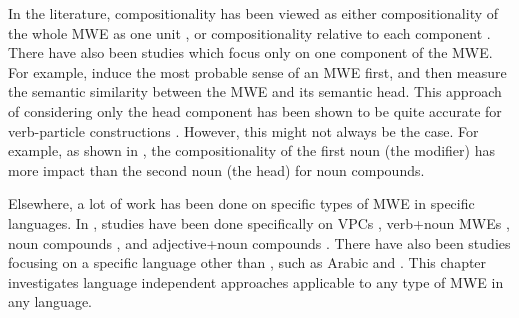 \documentclass[output=paper
,modfonts
,nonflat]{langsci/langscibook}
\begin{document}
In the literature, compositionality has been viewed as either
compositionality of the whole MWE as one unit
\citep{mccarthy2003,venkatapathy2005,Katz06automaticidentification,Biemann2011,farahmand2015},
or compositionality relative to each component
\citep{reddy2011a,hermann2012,SchulteImWalde+:2013}.  There have also
been studies which focus only on one component of the MWE.  For
example, \cite{korkontzelos2009} induce the most probable sense of an
MWE first, and then measure the semantic similarity between the MWE
and its semantic head.  This approach of considering only the head
component has been shown to be quite accurate for  verb-particle 
constructions \citep{bannard2003}. However, this might not
always be the case.  For example, as shown in \cite{reddy2011a}, the
compositionality of the first noun (the modifier) has more impact than
the second noun (the head) for  noun compounds.

Elsewhere, a lot of work has been done on specific types of MWE in
specific languages.  In , studies have been done specifically
on VPCs \citep{mccarthy2003,bannard2003}, verb+noun MWEs
\citep{venkatapathy2005,mccarthy2007,fazly-cook-stevenson:2009:CL},
noun compounds \citep{reddy2011a}, and adjective+noun compounds
\citep{vecchi2011}.  There have also been studies focusing on a
specific language other than , such as Arabic \citep{saif2013}
and  \citep{SchulteImWalde+:2013}. This chapter investigates
language independent approaches applicable to any type of MWE in any
language.


\end{document}
